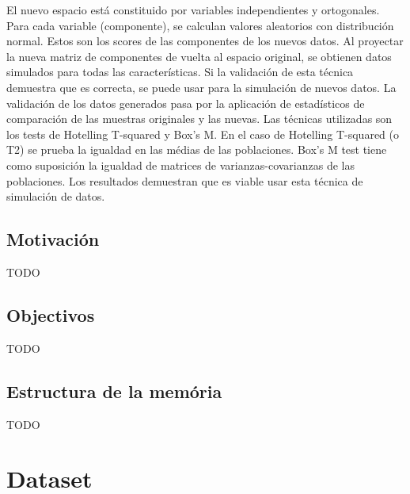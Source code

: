 \documentclass[11pt,spanish,listoffigures,listoftables]{tfgetsinf}
\begin{document}
El nuevo espacio está constituido por variables independientes y ortogonales. Para cada variable (componente), se calculan valores aleatorios con distribución normal. Estos son los scores de las componentes de los nuevos datos. Al proyectar la nueva matriz de componentes de vuelta al espacio original, se obtienen datos simulados para todas las características. Si la validación de esta técnica demuestra que es correcta, se puede usar para la simulación de nuevos datos. La validación de los datos generados pasa por la aplicación de estadísticos de comparación de las muestras originales y las nuevas. Las técnicas utilizadas son los tests de Hotelling T-squared y Box's M. En el caso de Hotelling T-squared (o T2) se prueba la igualdad en las médias de las poblaciones. Box's M test tiene como suposición la igualdad de matrices de varianzas-covarianzas de las poblaciones. Los resultados demuestran que es viable usar esta técnica de simulación de datos.

\section{Motivaci\'on}

TODO

\section{Objectivos}

TODO

\section{Estructura de la memória}

TODO




\chapter{Dataset}
\end{document}
